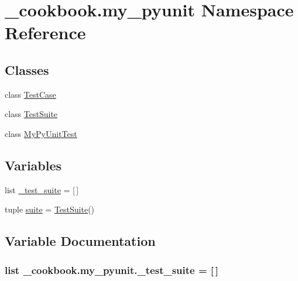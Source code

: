 \hypertarget{namespace__cookbook_1_1my__pyunit}{\section{\-\_\-cookbook.\-my\-\_\-pyunit Namespace Reference}
\label{namespace__cookbook_1_1my__pyunit}
}
\subsection*{Classes}
\begin{DoxyCompactItemize}
\item 
class \hyperlink{class__cookbook_1_1my__pyunit_1_1TestCase}{Test\-Case}
\item 
class \hyperlink{class__cookbook_1_1my__pyunit_1_1TestSuite}{Test\-Suite}
\item 
class \hyperlink{class__cookbook_1_1my__pyunit_1_1MyPyUnitTest}{My\-Py\-Unit\-Test}
\end{DoxyCompactItemize}
\subsection*{Variables}
\begin{DoxyCompactItemize}
\item 
list \hyperlink{namespace__cookbook_1_1my__pyunit_a1650ca62d0d76280d5c2a10f66c08aa8}{\-\_\-test\-\_\-suite} = \mbox{[}$\,$\mbox{]}
\item 
tuple \hyperlink{namespace__cookbook_1_1my__pyunit_a0d863c11cc0e82383e086450f052ecea}{suite} = \hyperlink{class__cookbook_1_1my__pyunit_1_1TestSuite}{Test\-Suite}()
\end{DoxyCompactItemize}


\subsection{Variable Documentation}
\hypertarget{namespace__cookbook_1_1my__pyunit_a1650ca62d0d76280d5c2a10f66c08aa8}{
\subsubsection[{\-\_\-test\-\_\-suite}]{\setlength{\rightskip}{0pt plus 5cm}list \-\_\-cookbook.\-my\-\_\-pyunit.\-\_\-test\-\_\-suite = \mbox{[}$\,$\mbox{]}}}\label{namespace__cookbook_1_1my__pyunit_a1650ca62d0d76280d5c2a10f66c08aa8}


